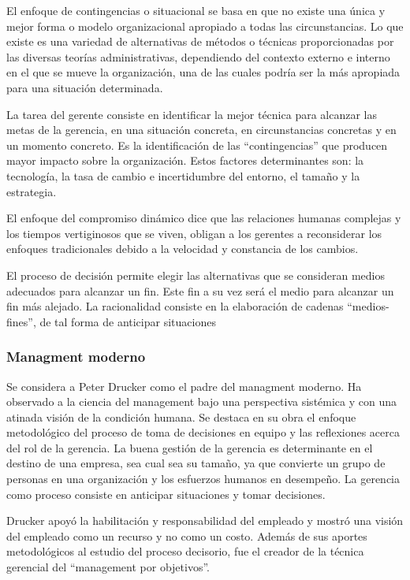 \documentclass[titlepage,a4paper]{article}
\begin{document}
El enfoque de contingencias o situacional se basa en que no existe una única y mejor forma o modelo organizacional apropiado a todas las circunstancias. Lo que existe es una variedad de alternativas de métodos o técnicas proporcionadas por las diversas teorías administrativas, dependiendo del contexto externo e interno en el que se mueve la organización, una de las cuales podría ser la más apropiada para una situación determinada.

La tarea del gerente consiste en identificar la mejor técnica para alcanzar las metas de la gerencia, en una situación concreta, en circunstancias concretas y en un momento concreto. Es la identificación de las “contingencias” que producen mayor impacto sobre la organización. Estos factores determinantes son: la tecnología, la tasa de cambio e incertidumbre del entorno, el tamaño y la estrategia. 

El enfoque del compromiso dinámico dice que las relaciones humanas complejas y los tiempos vertiginosos que se viven, obligan a los gerentes a reconsiderar los enfoques tradicionales debido a la velocidad y constancia de los cambios. 

El proceso de decisión permite elegir las alternativas que se consideran medios adecuados para alcanzar un fin. Este fin a su vez será el medio para alcanzar un fin más alejado. La racionalidad consiste en la elaboración de cadenas “medios-fines”, de tal forma de anticipar situaciones

\subsubsection*{Managment moderno}
Se considera a Peter Drucker como el padre del managment moderno. Ha observado a la ciencia del management bajo una perspectiva sistémica y con una atinada visión de la condición humana. Se destaca en su obra el enfoque metodológico del proceso de toma de decisiones en equipo y las reflexiones acerca del rol de la gerencia. La buena gestión de la gerencia es determinante en el destino de una empresa, sea cual sea su tamaño, ya que convierte un grupo de personas en una organización y los esfuerzos humanos en desempeño. La gerencia como proceso consiste en anticipar situaciones y tomar decisiones. 

Drucker apoyó la habilitación y responsabilidad del empleado y mostró una visión del empleado como un recurso y no como un costo. Además de sus aportes metodológicos al estudio del proceso decisorio, fue el creador de la técnica gerencial del “management por objetivos”. 
\end{document}
